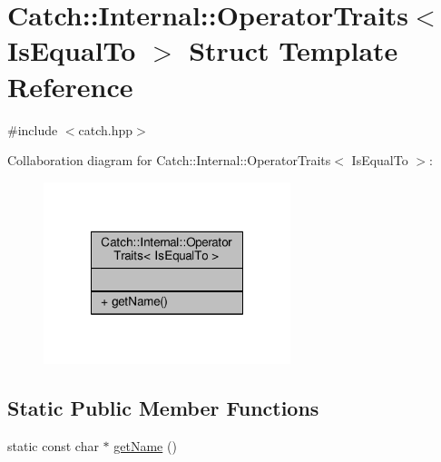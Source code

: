 \hypertarget{struct_catch_1_1_internal_1_1_operator_traits_3_01_is_equal_to_01_4}{\section{Catch\-:\-:Internal\-:\-:Operator\-Traits$<$ Is\-Equal\-To $>$ Struct Template Reference}
\label{struct_catch_1_1_internal_1_1_operator_traits_3_01_is_equal_to_01_4}
}


{\ttfamily \#include $<$catch.\-hpp$>$}



Collaboration diagram for Catch\-:\-:Internal\-:\-:Operator\-Traits$<$ Is\-Equal\-To $>$\-:
\nopagebreak
\begin{figure}[H]
\begin{center}
\leavevmode
\includegraphics[width=204pt]{struct_catch_1_1_internal_1_1_operator_traits_3_01_is_equal_to_01_4__coll__graph}
\end{center}
\end{figure}
\subsection*{Static Public Member Functions}
\begin{DoxyCompactItemize}
\item 
static const char $\ast$ \hyperlink{struct_catch_1_1_internal_1_1_operator_traits_3_01_is_equal_to_01_4_addf03ac66f0ed83abcc037a7a327d4f1}{get\-Name} ()
\end{DoxyCompactItemize}



